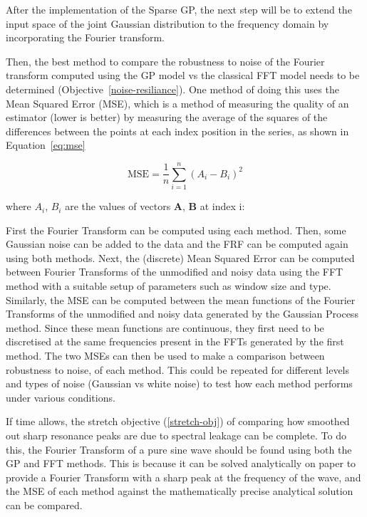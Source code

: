 \documentclass[12pt]{article}
\begin{document}
    After the implementation of the Sparse GP, the next step will be to extend the input space of the joint Gaussian distribution to the frequency domain by incorporating the Fourier transform.

    Then, the best method to compare the robustness to noise of the Fourier transform computed using the GP model vs the classical FFT model needs to be determined (Objective~\ref{noise-resiliance}).
    One method of doing this uses the Mean Squared Error (MSE), which is a method of measuring the quality of an estimator (lower is better) by measuring the average of the squares of the differences between the points at each index position in the series, as shown in Equation~\ref{eq:mse}

    \begin{equation}
        \text{MSE} = \frac{1}{n} \sum_{i=1}^{n} (A_i - B_i)^2
        \label{eq:mse}
    \end{equation}


    \noindent where $A_i$, $B_i$ are the values of vectors $\mathbf{A}$, $\mathbf{B}$ at index i:

    First the Fourier Transform can be computed using each method.
    Then, some Gaussian noise can be added to the data and the FRF can be computed again using both methods.
    Next, the (discrete) Mean Squared Error can be computed between Fourier Transforms of the unmodified and noisy data using the FFT method with a suitable setup of parameters such as window size and type.
    Similarly, the MSE can be computed between the mean functions of the Fourier Transforms of the unmodified and noisy data generated by the Gaussian Process method.
    Since these mean functions are continuous, they first need to be discretised at the same frequencies present in the FFTs generated by the first method.
    The two MSEs can then be used to make a comparison between robustness to noise, of each method.
    This could be repeated for different levels and types of noise (Gaussian vs white noise) to test how each method performs under various conditions.

    If time allows, the stretch objective (\ref{stretch-obj}) of comparing how smoothed out sharp resonance peaks are due to spectral leakage can be complete.
    To do this, the Fourier Transform of a pure sine wave should be found using both the GP and FFT methods.
    This is because it can be solved analytically on paper to provide a Fourier Transform with a sharp peak at the frequency of the wave, and the MSE of each method against the mathematically precise analytical solution can be compared.
\end{document}
